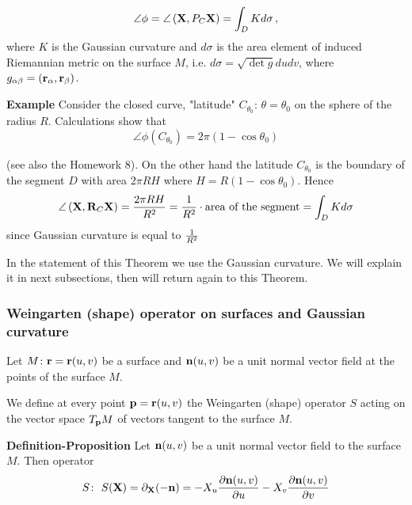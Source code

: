 \documentclass[12pt]{article}
\theoremstyle{theorem}
\numberwithin{equation}{section}
\begin{document}
{{\begin{equation}\label{theoremofrotationonangle}
\angle\phi=\angle\left({{\bf X}, P_C{\bf X}}\right)=\int_D K d\sigma\,,
             \end{equation}
where $K$ is the Gaussian curvature and 
$d\sigma$
is the area element of induced 
Riemannian metric on the surface $M$, 
i.e.  $d\sigma=\sqrt {\det g}dudv$, where
$g_{\alpha\beta}=({\bf r}_\alpha,{\bf r}_\beta)$.



}

\m


{\bf Example} Consider the closed curve, "latitude" $C_{\theta_0}\colon\,\theta=\theta_0$ on the sphere of the radius $R$.
Calculations show that
               \begin{equation}\label{rotationforlatitude}
                \angle\phi(C_{\theta_0})=2\pi(1-\cos\theta_0)
               \end{equation}

(see also the Homework 8). On the other hand the latitude $C_{\theta_0}$ 
is the boundary of the segment  $D$
 with area $2\pi RH$ where $H=R(1-\cos \theta_0)$. Hence
           $$
   \angle\left({{\bf X}, {\bf R}_C{\bf X}}\right)={2\pi RH\over R^2}={1\over R^2}\cdot \hbox{area of the segment}=\int_D  Kd\sigma
           $$
since Gaussian curvature is equal to $1\over R^2$


In the statement of this Theorem we use the Gaussian curvature. We will explain
it in next subsections, then will return again to 
this Theorem.



\subsubsection {Weingarten (shape) operator on surfaces and Gaussian curvature}



\def\xip {{\boldsymbol \xi}}
Let $M\colon {\bf r}={\bf r}(u,v)$ be a surface 
and ${\bf n}(u,v)$ be a unit normal
   vector field at the points of the surface  $M$.
  
We define at every point ${\bf p}={\bf r}(u,v)$ the 
Weingarten (shape) operator $S$ 
acting on the vector space $T_{\bf p} M$ of 
vectors tangent to the surface $M$.


\bigskip
{\bf Definition-Proposition} Let ${\bf n}(u,v)$ be a unit normal vector field to the surface  $M$.
Then operator
\begin{equation}\label{defofshapeoperator}
    S\colon\,\,S({\bf X})=\partial_{\bf X} (-{\bf n})=
-X_u{\partial { {\bf n}}(u,v)\over \partial u}-X_v{\partial {{\bf n}}(u,v)\over \partial v}
\end{equation}


}
\end{document}
